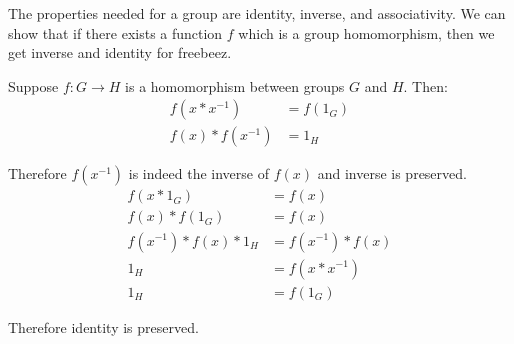 \begin{proofitem}
\item The properties needed for a group are identity, inverse, and
    associativity. We can show that if there exists a function $f$ which is a
    group homomorphism, then we get inverse and identity for freebeez.
\item Suppose $f: G \rightarrow H$ is a homomorphism between groups $G$ and $H$. Then:
\begin{align*}
    f(x\ast x^{-1}) &= f(1_G)\\
    f(x)\ast f(x^{-1}) &= 1_H
\end{align*}
\item Therefore $f(x^{-1})$ is indeed the inverse of $f(x)$ and inverse is
    preserved.
\begin{align*}
    f(x\ast 1_G) &= f(x)\\
    f(x)\ast f(1_G) &= f(x)\\
    f(x^{-1})\ast f(x)\ast 1_H &= f(x^{-1})\ast f(x)\\
    1_H &= f(x\ast x^{-1})\\
    1_H &= f(1_G)
\end{align*}
\item Therefore identity is preserved.
\end{proofitem}
